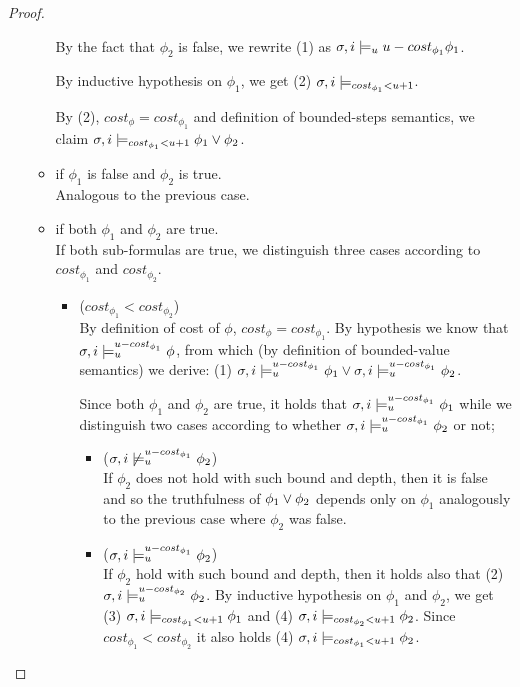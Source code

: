 \begin{theorem}
\begin{lemma}
\begin{proof}
\begin{itemize}
\begin{itemize}
        By the fact that $\phi_2$ is false, we rewrite (1) as $\sigma,i \models_{u}{u-cost_{\phi_1}} \phi_1$.

        By inductive hypothesis on $\phi_1$, we get (2) $\sigma,i \models_{cost_{\phi_1} < u + 1}$.

        By (2), $cost_\phi = cost_{\phi_1}$ and definition of bounded-steps semantics, we claim $\sigma,i \models_{cost_{\phi_1} < u + 1} \phi_1 \lor \phi_2$.

        \item if $\phi_1$ is false and $\phi_2$ is true. \\
        Analogous to the previous case.

        \item if both $\phi_1$ and $\phi_2$ are true. \\
        If both sub-formulas are true, we distinguish three cases according to $cost_{\phi_1}$ and $cost_{\phi_2}$.
        \begin{itemize}
            \item ($cost_{\phi_1} < cost_{\phi_2}$) \\
            By definition of cost of $\phi$, $cost_\phi = cost_{\phi_1}$.
            By hypothesis we know that $\sigma,i \models_{u}^{u-cost_{\phi_1}} \phi$, from which (by definition of bounded-value semantics) we derive: 
            (1) $\sigma,i \models_{u}^{u-cost_{\phi_1}} \phi_1 \lor \sigma,i \models_{u}^{u-cost_{\phi_1}} \phi_2$.

            Since both $\phi_1$ and $\phi_2$ are true, it holds that $\sigma,i \models_{u}^{u-cost_{\phi_1}} \phi_1$ while we distinguish two cases according to whether $\sigma,i \models_{u}^{u-cost_{\phi_1}} \phi_2$ or not;
            \begin{itemize}
                \item ($\sigma,i \not\models_{u}^{u-cost_{\phi_1}} \phi_2$) \\
                If $\phi_2$ does not hold with such bound and depth, then it is false and so the truthfulness of $\phi_1 \lor \phi_2$ depends only on $\phi_1$ analogously to the previous case where $\phi_2$ was false.
                \item ($\sigma,i \models_{u}^{u-cost_{\phi_1}} \phi_2$) \\
                If $\phi_2$ hold with such bound and depth, then it holds also that (2) $\sigma,i \models_{u}^{u-cost_{\phi_2}} \phi_2$.
                By inductive hypothesis on $\phi_1$ and $\phi_2$, we get (3) $\sigma,i \models_{cost_{\phi_1} < u + 1} \phi_1$ and (4) $\sigma,i \models_{cost_{\phi_2} < u + 1} \phi_2$.
                Since $cost_{\phi_1} < cost_{\phi_2}$ it also holds (4) $\sigma,i \models_{cost_{\phi_1} < u + 1} \phi_2$.


\end{itemize}
\end{itemize}
\end{itemize}
\end{itemize}
\end{proof}
\end{lemma}
\end{theorem}
